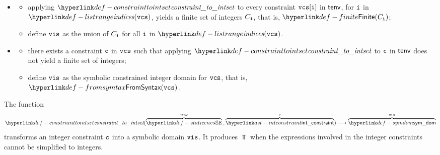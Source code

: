 \ProseParagraph
\OneApplies
\begin{itemize}
  \item {}
  \begin{itemize}
    \item applying $\constrainttointset$ to every constraint $\vcs[\vi]$ in $\tenv$, for $\vi$ in \\ $\listrange(\vcs)$,
          yields a finite set of integers $C_\vi$, that is, $\Finite(C_\vi)$;
    \item define $\vis$ as the union of $C_\vi$ for all $\vi$ in $\listrange(\vcs)$.
  \end{itemize}

  \item {}
  \begin{itemize}
    \item there exists a constraint $\vc$ in $\vcs$ such that applying $\constrainttointset$ to $\vc$
          in $\tenv$ does not yield a finite set of integers;
    \item define $\vis$ as the symbolic constrained integer domain for $\vcs$, that is, \\
          $\FromSyntax(\vcs)$.
  \end{itemize}
\end{itemize}

\FormallyParagraph
\begin{mathpar}
\end{mathpar}

\begin{mathpar}
\end{mathpar}

\hypertarget{def-constrainttointset}{}
The function
\[
  \constrainttointset(
    \overname{\staticenvs}{\tenv} \aslsep
    \overname{\intconstraint}{\vc}
  ) \aslto
  \overname{\symdom}{\vis}
\]
transforms an integer constraint $\vc$ into a symbolic domain $\vis$.
It produces $\Top$ when the expressions involved in the integer constraints cannot be simplified
to integers.

